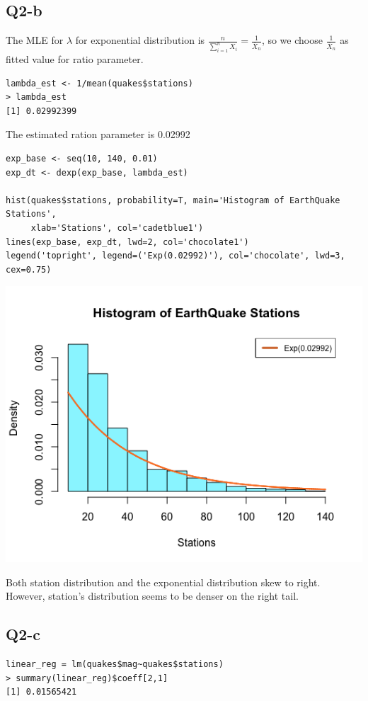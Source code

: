 \documentclass[12pt,letterpaper]{article}
\begin{document}
\newpage
\subsection*{Q2-b}
\noindent The MLE for $\lambda$ for exponential distribution is $\frac{n}{\sum_{i=1}^{n}X_i} = \frac{1}{\bar{X}_n}$, so we choose $\frac{1}{\bar{X}_n}$ as fitted value for ratio parameter.

\begin{verbatim}
lambda_est <- 1/mean(quakes$stations)
> lambda_est
[1] 0.02992399
\end{verbatim}

\noindent The estimated ration parameter is 0.02992

\begin{verbatim}
exp_base <- seq(10, 140, 0.01)
exp_dt <- dexp(exp_base, lambda_est)

hist(quakes$stations, probability=T, main='Histogram of EarthQuake Stations',
     xlab='Stations', col='cadetblue1')
lines(exp_base, exp_dt, lwd=2, col='chocolate1')
legend('topright', legend=('Exp(0.02992)'), col='chocolate', lwd=3, cex=0.75)
\end{verbatim}

\includegraphics[width=150mm]{hist_exp.png}

\noindent Both station distribution and the exponential distribution skew to right. However, station's distribution seems to be denser on the right tail.  

\newpage
\subsection*{Q2-c}
\begin{verbatim}
linear_reg = lm(quakes$mag~quakes$stations)
> summary(linear_reg)$coeff[2,1]
[1] 0.01565421
\end{verbatim}
\end{document}
